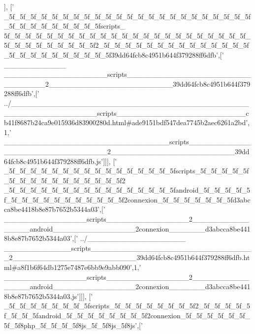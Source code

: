\begin{DoxyCode}
      ],
  [\textcolor{stringliteral}{'
      \_5f\_5f\_5f\_5f\_5f\_5f\_5f\_5f\_5f\_5f\_5f\_5f\_5f\_5f\_5f\_5f\_5f\_5f\_5f\_5f\_5f\_5f\_5f\_5f\_5f\_5f\_5f\_5f\_5f\_5f\_5f\_5fscripts\_
      5f\_5f\_5f\_5f\_5f\_5f\_5f\_5f\_5f\_5f\_5f\_5f\_5f\_5f\_5f\_5f\_5f\_5f\_5f\_5f\_5f\_5f\_5f\_5f\_5f\_5f\_5f\_5f\_5f\_5f\_5f\_5f2\_5f\_5f\_5f\_5f\_5f\_5f\_5f\_5f\_5f\_5f\_5f\_5f\_5f\_5f\_5f\_5f\_5f\_5f\_5f\_5f\_5f\_5f\_5f\_5f39dd64fcb8c4951b644f379288ff6dfb'},[\textcolor{stringliteral}{'
      \_\_\_\_\_\_\_\_\_\_\_\_
      \_\_\_\_\_\_\_\_\_\_\_\_\_\_\_\_\_\_\_\_scripts\_\_\_\_\_\_\_\_\_\_\_\_\_\_\_\_\_\_\_\_\_\_\_\_\_\_\_\_\_\_\_\_2\_\_\_\_\_\_\_\_\_\_\_\_\_\_\_\_\_\_\_\_\_\_\_\_39dd64fcb8c4951b644f379288ff6dfb'},[\textcolor{stringliteral}{'
      ../\_\_\_\_\_\_\_\_\_\_\_\_\_\_\_\_\_\_\_\_\_\_\_\_\_\_\_\_\_\_\_\_\_\_\_\_\_\_\_\_\_\_\_\_\_\_\_\_\_\_\_\_\_\_\_\_\_\_\_\_\_\_\_\_scripts\_\_\_\_\_\_\_\_\_\_\_\_\_\_\_\_\_\_\_\_\_\_\_\_\_cb41f8687b24ca9e015936d83900280d.html#ade9151bdf547dea7745b2aec6261a2bd'},1,\textcolor{stringliteral}{'
      \_\_\_\_\_\_\_\_\_\_\_\_\_\_\_\_\_\_\_\_\_\_\_\_\_\_\_\_\_\_\_\_scripts\_\_\_\_\_\_\_\_\_\_\_\_\_\_\_\_\_\_\_\_\_\_\_\_\_\_\_\_\_\_\_\_2\_\_\_\_\_\_\_\_\_\_\_\_\_\_\_\_\_\_\_\_\_\_\_\_39dd64fcb8c4951b644f379288ff6dfb.js'}]]],
  [\textcolor{stringliteral}{'
      \_5f\_5f\_5f\_5f\_5f\_5f\_5f\_5f\_5f\_5f\_5f\_5f\_5f\_5f\_5f\_5fscripts\_5f\_5f\_5f\_5f\_5f\_5f\_5f\_5f\_5f\_5f\_5f\_5f\_5f\_5f\_5f\_5f2
      \_5f\_5f\_5f\_5f\_5f\_5f\_5f\_5f\_5f\_5f\_5f\_5f\_5f\_5f\_5f\_5fandroid\_5f\_5f\_5f\_5f\_5f\_5f\_5f\_5f\_5f\_5f\_5f\_5f\_5f\_5f\_5f\_5f2connexion\_5f\_5f\_5f\_5f\_5f\_5f\_5fd3abcca8be4418b8e87b7652b5344a03'},[\textcolor{stringliteral}{'
      \_\_\_\_\_\_\_\_\_\_\_\_\_\_\_\_scripts\_\_\_\_\_\_\_\_\_\_\_\_\_\_\_\_2\_\_\_\_\_\_\_\_\_\_\_\_\_\_\_\_android\_\_\_\_\_\_\_\_\_\_\_\_\_\_\_\_2connexion\_\_\_\_\_\_\_d3abcca8be4418b8e87b7652b5344a03'},[\textcolor{stringliteral}{'
      ../\_\_\_\_\_\_\_\_\_\_\_\_\_\_\_\_\_\_\_
      \_\_\_\_\_\_\_\_\_\_\_\_\_scripts\_\_\_\_\_\_\_\_\_\_\_\_\_\_\_\_\_\_\_\_\_\_\_\_\_\_\_\_\_\_\_\_2\_\_\_\_\_\_\_\_\_\_\_\_\_\_\_\_\_\_\_\_\_\_\_\_39dd64fcb8c4951b644f379288ff6dfb.html#a8f1b6f64db1275e7487e6bb9e9abb090'},1,\textcolor{stringliteral}{'
      \_\_\_\_\_\_\_\_\_\_\_\_\_\_\_\_scripts\_\_\_\_\_\_\_\_\_\_\_\_\_\_\_\_2\_\_\_\_\_\_\_\_\_\_\_\_\_\_\_\_android\_\_\_\_\_\_\_\_\_\_\_\_\_\_\_\_2connexion\_\_\_\_\_\_\_d3abcca8be4418b8e87b7652b5344a03.js'}]]],
  [\textcolor{stringliteral}{'
      \_5f\_5f\_5f\_5f\_5f\_5f\_5f\_5fscripts\_5f\_5f\_5f\_5f\_5f\_5f\_5f\_5f2\_5f\_5f\_5f\_5f\_5f\_5f\_5f\_5fandroid\_5f\_5f\_5f\_5f\_5f\_5f\_5f\_5f2connexion\_5f\_5f\_5f\_5f\_5f\_5f\_5f\_5f8php\_5f\_5f\_5f\_5f8js\_5f\_5f8js\_5f8js'},[\textcolor{stringliteral}{'
}
\end{DoxyCode}
